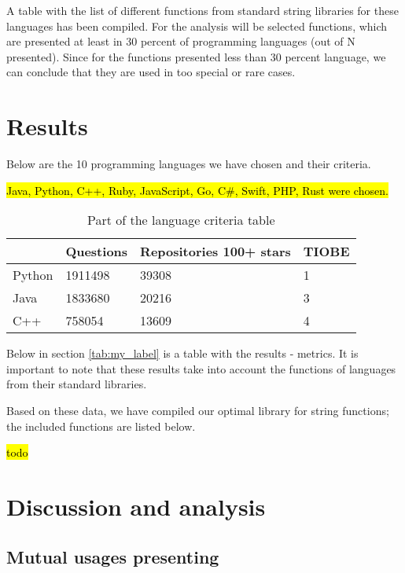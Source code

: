 \documentclass[anonymous,sigplan,review,11pt,nonacm,natbib=false]{acmart}
\begin{document}
    A table with the list of different functions from standard string libraries for these languages has been compiled. For the analysis will be selected functions, which are presented at least in 30 percent of programming languages (out of N presented). Since for the functions presented less than 30 percent language, we can conclude that they are used in too special or rare cases.



    \section{Results}

    Below are the 10 programming languages we have chosen and their criteria.

    \hl{Java, Python, C++, Ruby, JavaScript, Go, C\#, Swift, PHP, Rust were chosen.}

    \begin{table}[h]
        \begin{tabular}{llll}
            \hline
            & Questions
            & Repositories 100+ stars
            & TIOBE
            \\ \hline

            Python & 1911498 & 39308 & 1 \\

            Java & 1833680 & 20216 & 3 \\

            C++ & 758054 & 13609 & 4 \\ \hline
        \end{tabular}
        \caption{Part of the language criteria table}
    \end{table}

    Below in section \ref{tab:my_label} is a table with the results - metrics. It is important to note that these results take into account the functions of languages from their standard libraries.

    Based on these data, we have compiled our optimal library for string functions; the included functions are listed below.

    \hl{todo}

    \section{Discussion and analysis}

    \subsection{Mutual usages presenting}
\end{document}
